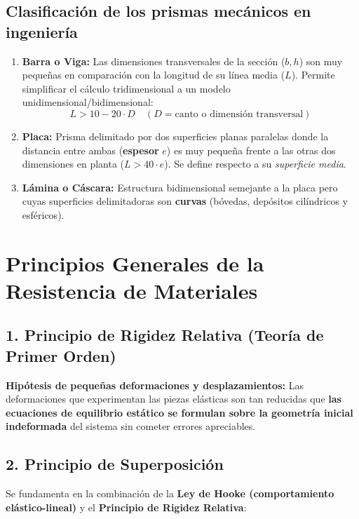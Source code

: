 \subsection{Clasificación de los prismas mecánicos en ingeniería}
\begin{enumerate}
    \item \textbf{Barra o Viga:} Las dimensiones transversales de la sección ($b, h$) son muy pequeñas en comparación con la longitud de su línea media ($L$). Permite simplificar el cálculo tridimensional a un modelo unidimensional/bidimensional:
          \begin{equation}
              L > 10 - 20 \cdot D \quad (D = \text{canto o dimensión transversal})
          \end{equation}
    \item \textbf{Placa:} Prisma delimitado por dos superficies planas paralelas donde la distancia entre ambas (\textbf{espesor} $e$) es muy pequeña frente a las otras dos dimensiones en planta ($L > 40\cdot e$). Se define respecto a su \textit{superficie media}.
    \item \textbf{Lámina o Cáscara:} Estructura bidimensional semejante a la placa pero cuyas superficies delimitadoras son \textbf{curvas} (bóvedas, depósitos cilíndricos y esféricos).
\end{enumerate}

\section{Principios Generales de la Resistencia de Materiales}

\subsection{1. Principio de Rigidez Relativa (Teoría de Primer Orden)}
\textbf{Hipótesis de pequeñas deformaciones y desplazamientos:} Las deformaciones que experimentan las piezas elásticas son tan reducidas que \textbf{las ecuaciones de equilibrio estático se formulan sobre la geometría inicial indeformada} del sistema sin cometer errores apreciables.

\subsection{2. Principio de Superposición}
Se fundamenta en la combinación de la \textbf{Ley de Hooke (comportamiento elástico-lineal)} y el \textbf{Principio de Rigidez Relativa}:

